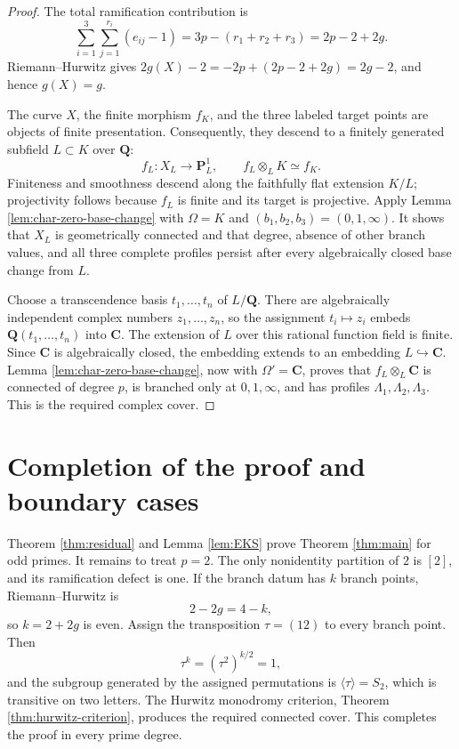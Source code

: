 \documentclass[10pt,a4paper]{amsart}
\numberwithin{equation}{section}
\begin{document}
\begin{proof}
The total ramification contribution is
\[
 \sum_{i=1}^{3}\sum_{j=1}^{r_i}(e_{ij}-1)
 =3p-(r_1+r_2+r_3)=2p-2+2g.
\]
Riemann--Hurwitz gives $2g(X)-2=-2p+(2p-2+2g)=2g-2$,
and hence $g(X)=g$.

The curve $X$, the finite morphism $f_K$, and the three labeled target
points are objects of finite presentation.  Consequently, they descend to
a finitely generated subfield $L\subset K$ over $\mathbf Q$:
\[
 f_L:X_L\longrightarrow\mathbf P^1_L,
 \qquad
 f_L\otimes_L K\simeq f_K.
\]
Finiteness and smoothness descend along the faithfully flat extension
$K/L$; projectivity follows because $f_L$ is finite and its target is
projective.  Apply Lemma \ref{lem:char-zero-base-change} with
$\Omega=K$ and $(b_1,b_2,b_3)=(0,1,\infty)$.  It shows that $X_L$ is
geometrically connected and that degree, absence of other branch values,
and all three complete profiles persist after every algebraically closed
base change from $L$.

Choose a transcendence basis $t_1,\ldots,t_n$ of $L/\mathbf Q$.  There are
algebraically independent complex numbers $z_1,\ldots,z_n$, so the
assignment $t_i\mapsto z_i$ embeds
$\mathbf Q(t_1,\ldots,t_n)$ into $\mathbf C$.  The extension of $L$ over
this rational function field is finite.  Since $\mathbf C$ is algebraically
closed, the embedding extends to an embedding $L\hookrightarrow\mathbf C$.
Lemma \ref{lem:char-zero-base-change}, now with $\Omega'=\mathbf C$, proves
that $f_L\otimes_L\mathbf C$ is connected of degree $p$, is branched only
at $0,1,\infty$, and has profiles
$\Lambda_1,\Lambda_2,\Lambda_3$.  This is the required complex cover.
\end{proof}

\section{Completion of the proof and boundary cases}

Theorem \ref{thm:residual} and Lemma \ref{lem:EKS} prove Theorem
\ref{thm:main} for odd primes.  It remains to treat $p=2$.  The only
nonidentity partition of $2$ is $[2]$, and its ramification defect is one.
If the branch datum has $k$ branch points, Riemann--Hurwitz is
\[
 2-2g=4-k,
\]
so $k=2+2g$ is even.  Assign the transposition $\tau=(12)$ to every branch
point.  Then
\[
 \tau^k=(\tau^2)^{k/2}=1,
\]
and the subgroup generated by the assigned permutations is
$\langle\tau\rangle=S_2$, which is transitive on two letters.  The Hurwitz
monodromy criterion, Theorem \ref{thm:hurwitz-criterion}, produces the
required connected cover.  This completes the proof in every prime degree.
\end{document}
